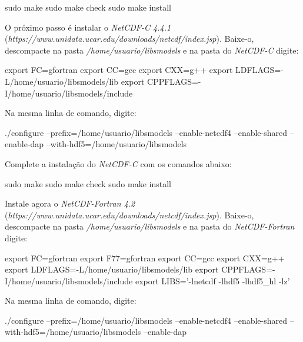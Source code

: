 \begin{bashcode}
sudo make
sudo make check
sudo make install
\end{bashcode}
\bigskip

\noindent O próximo passo é instalar o \textit{NetCDF-C 4.4.1} (\textcolor{bleu_cite}{\textit{https://www.unidata.ucar.edu/downloads/netcdf/index.jsp}}). Baixe-o, descompacte na pasta \textit{/home/usuario/libsmodels} e na pasta do \textit{NetCDF-C} digite:
\bigskip

\begin{bashcode}[fontsize=\scriptsize]
export FC=gfortran
export CC=gcc
export CXX=g++
export LDFLAGS=-L/home/usuario/libsmodels/lib
export CPPFLAGS=-I/home/usuario/libsmodels/include
\end{bashcode}
\bigskip

\noindent Na mesma linha de comando, digite:
\bigskip

\begin{bashcode}[fontsize=\scriptsize]
./configure --prefix=/home/usuario/libsmodels --enable-netcdf4 --enable-shared --enable-dap
--with-hdf5=/home/usuario/libsmodels 
\end{bashcode}
\bigskip

\noindent Complete a instalação do \textit{NetCDF-C} com os comandos abaixo:
\bigskip

\begin{bashcode}
sudo make
sudo make check
sudo make install
\end{bashcode}
\bigskip

\noindent Instale agora o \textit{NetCDF-Fortran 4.2} (\textcolor{bleu_cite}{\textit{https://www.unidata.ucar.edu/downloads/netcdf/index.jsp}}). Baixe-o, descompacte na pasta \textit{/home/usuario/libsmodels} e na pasta do \textit{NetCDF-Fortran} digite:
\bigskip

\begin{bashcode}[fontsize=\scriptsize]
export FC=gfortran
export F77=gfortran
export CC=gcc
export CXX=g++
export LDFLAGS=-L/home/usuario/libsmodels/lib
export CPPFLAGS=-I/home/usuario/libsmodels/include
export LIBS='-lnetcdf -lhdf5 -lhdf5_hl -lz'
\end{bashcode}
\bigskip

\noindent Na mesma linha de comando, digite:
\bigskip

\begin{bashcode}
./configure --prefix=/home/usuario/libsmodels --enable-netcdf4 --enable-shared
--with-hdf5=/home/usuario/libsmodels --enable-dap
\end{bashcode}
\bigskip

